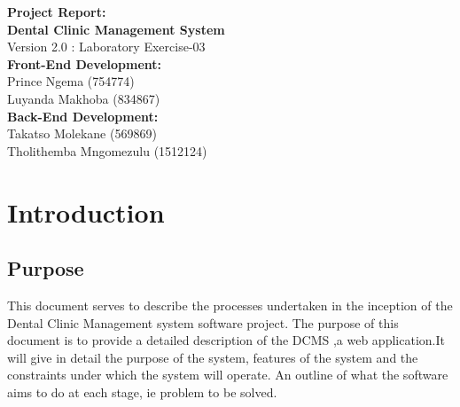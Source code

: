 \documentclass[11 pt]{article}
\begin{document}
  
  \begin{titlepage}
\begin{center}
\huge{\bfseries{Project Report:}}\\
[2mm]
\huge{\bfseries{Dental Clinic Management System}}\\
Version 2.0 : Laboratory Exercise-03\\
  \vskip 0.2in
  \large{\bfseries{Front-End Development:}}\\
 Prince Ngema (754774)\\
 Luyanda Makhoba (834867) \\
 
 \large{\bfseries{Back-End Development:}}\\
 Takatso Molekane (569869)\\
 Tholithemba Mngomezulu (1512124)\\
 
\end{center}
 \end{titlepage}
 \tableofcontents
 \newpage
\section{Introduction}

\subsection{Purpose}
This document serves to describe the processes undertaken in the inception of the Dental Clinic Management system software project. The purpose of this document is to provide a detailed description of the DCMS ,a web application.It will give in detail the purpose of the system, features of the system  and the constraints under which the system will operate. An outline of what the software aims to do at each stage, ie problem to be solved. 
\end{document}

